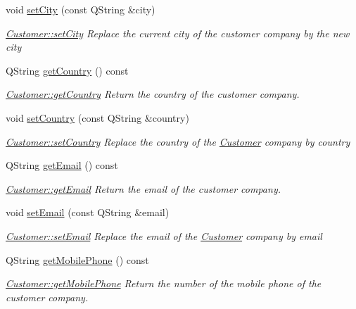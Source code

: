 \begin{DoxyCompactItemize}
void \hyperlink{classCustomer_a1fb29f507135a9f21b29e7799aec14f0}{set\+City} (const Q\+String \&city)
\begin{DoxyCompactList}\small\item\em \hyperlink{classCustomer_a1fb29f507135a9f21b29e7799aec14f0}{Customer\+::set\+City} Replace the current city of the customer company by the new {\itshape city} \end{DoxyCompactList}\item 
Q\+String \hyperlink{classCustomer_a426126096db853802249e10506dc138c}{get\+Country} () const 
\begin{DoxyCompactList}\small\item\em \hyperlink{classCustomer_a426126096db853802249e10506dc138c}{Customer\+::get\+Country} Return the country of the customer company. \end{DoxyCompactList}\item 
void \hyperlink{classCustomer_a81545977d1de88b4ffd6f6b1356ea118}{set\+Country} (const Q\+String \&country)
\begin{DoxyCompactList}\small\item\em \hyperlink{classCustomer_a81545977d1de88b4ffd6f6b1356ea118}{Customer\+::set\+Country} Replace the country of the \hyperlink{classCustomer}{Customer} company by {\itshape country} \end{DoxyCompactList}\item 
Q\+String \hyperlink{classCustomer_a6ab797361537bf4c8b35cce5f1562299}{get\+Email} () const 
\begin{DoxyCompactList}\small\item\em \hyperlink{classCustomer_a6ab797361537bf4c8b35cce5f1562299}{Customer\+::get\+Email} Return the email of the customer company. \end{DoxyCompactList}\item 
void \hyperlink{classCustomer_a64b383efde5855bde7ef385c6f73e45d}{set\+Email} (const Q\+String \&email)
\begin{DoxyCompactList}\small\item\em \hyperlink{classCustomer_a64b383efde5855bde7ef385c6f73e45d}{Customer\+::set\+Email} Replace the email of the \hyperlink{classCustomer}{Customer} company by {\itshape email} \end{DoxyCompactList}\item 
Q\+String \hyperlink{classCustomer_a08546759b1b1f046389bc6ab6b467149}{get\+Mobile\+Phone} () const 
\begin{DoxyCompactList}\small\item\em \hyperlink{classCustomer_a08546759b1b1f046389bc6ab6b467149}{Customer\+::get\+Mobile\+Phone} Return the number of the mobile phone of the customer company. \end{DoxyCompactList}\item 

\end{DoxyCompactItemize}
